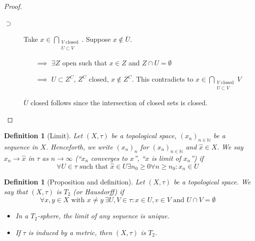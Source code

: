 \documentclass[a4paper]{article}
\newcounter{lecref}[section]
\numberwithin{lecref}{section}
\newtheorem{definition}[lecref]{Definition}
\begin{document}
\begin{proof}
\begin{enumerate}
\begin{description}
				\item[$\supset$]
					Take $x \in \bigcap_{\substack{V \text{ closed} \\ U \subset V}}$. Suppose $x \not\in \overline U$.
					\begin{itemize}
						\item[$\implies$] $\exists Z$ open such that $x \in Z$ and $Z \cap U = \emptyset$
						\item[$\implies$] $U \subset Z^C$, $Z^C$ closed, $x \not\in Z^C$. This contradicts to $x \in \bigcap_{\substack{V \text{ closed} \\ U \subset V}} V$
					\end{itemize}
					$\overline U$ closed follows since the intersection of closed sets is closed.
			\end{description}
	\end{enumerate}
\end{proof}

\begin{definition}[Limit]
	\label{definition:1.7}
	Let $(X, \tau)$ be a topological space, $(x_n)_{n \in \mathbb N}$ be a sequence in $X$. Henceforth, we write $(x_n)_{n}$ for $(x_n)_{n \in \mathbb N}$ and $\hat x \in X$. We say $x_n \to \hat x$ in $\tau$ as $n \to \infty$ (\enquote{$x_n$ converges to $x$}, \enquote{$x$ is limit of $x_n$}) if
	\[ \forall U \in \tau \text{ such that } \hat x \in U \exists n_0 \geq 0 \forall n \geq n_0: x_n \in U \]
\end{definition}

\begin{definition}[Proposition and definition]
	\label{definition:1.8}
	Let $(X, \tau)$ be a topological space. We say that $(X, \tau)$ is $T_2$ (or Hausdorff) if 
	\[ \forall x, y \in X \text{ with } x \neq y \: \exists U, V \in \tau: x \in U, v \in V \text{ and } U \cap V = \emptyset \]
	\begin{itemize}
		\item In a $T_2$-sphere, the limit of any sequence is unique.
		\item If $\tau$ is induced by a metric, then $(X, \tau)$ is $T_2$.
	\end{itemize}
\end{definition}
\end{document}
